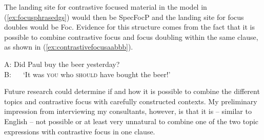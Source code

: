 \noindent The landing site for contrastive focused material in the model in (\ref{ex:focusphrasedgs}) would then be SpecFocP and the landing site for focus doubles would be Foc\textdegree . Evidence for this structure comes from the fact that it is possible to combine contrastive focus and focus doubling within the same clause, as shown in (\ref{ex:contrastivefocusaabbb}).

\begin{exe}
\ex
A: Did Paul buy the beer yesterday? \\
B:   
\glt \textcolor{white}{B: }`It was \textsc{you} who \textsc{should} have bought the beer!' \label{ex:contrastivefocusaabbb}
\end{exe}

\noindent Future research could determine if and how it is possible to combine the different topics and contrastive focus with carefully constructed contexts. My preliminary impression from interviewing my consultants, however, is that it is -- similar to English -- not possible or at least very unnatural to combine one of the two topic expressions with contrastive focus in one clause.



\largerpage[-1]

